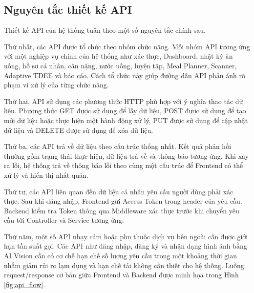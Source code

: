 \documentclass[12pt, a4paper]{report}
\begin{document}
\subsection{Nguyên tắc thiết kế API}Thiết kế API của hệ thống tuân theo một số nguyên tắc chính sau.

Thứ nhất, các API được tổ chức theo nhóm chức năng. Mỗi nhóm API tương ứng với một nghiệp vụ chính của hệ thống như xác thực, Dashboard, nhật ký ăn uống, hồ sơ cá nhân, cân nặng, nước uống, luyện tập, Meal Planner, Scanner, Adaptive TDEE và báo cáo. Cách tổ chức này giúp đường dẫn API phản ánh rõ phạm vi xử lý của từng chức năng.

Thứ hai, API sử dụng các phương thức HTTP phù hợp với ý nghĩa thao tác dữ liệu. Phương thức GET được sử dụng để lấy dữ liệu, POST được sử dụng để tạo mới dữ liệu hoặc thực hiện một hành động xử lý, PUT được sử dụng để cập nhật dữ liệu và DELETE được sử dụng để xóa dữ liệu.

Thứ ba, các API trả về dữ liệu theo cấu trúc thống nhất. Kết quả phản hồi thường gồm trạng thái thực hiện, dữ liệu trả về và thông báo tương ứng. Khi xảy ra lỗi, hệ thống trả về thông báo lỗi theo cùng một cấu trúc để Frontend có thể xử lý và hiển thị nhất quán.

Thứ tư, các API liên quan đến dữ liệu cá nhân yêu cầu người dùng phải xác thực. Sau khi đăng nhập, Frontend gửi Access Token trong header của yêu cầu. Backend kiểm tra Token thông qua Middleware xác thực trước khi chuyển yêu cầu tới Controller và Service tương ứng.

Thứ năm, một số API nhạy cảm hoặc phụ thuộc dịch vụ bên ngoài cần được giới hạn tần suất gọi. Các API như đăng nhập, đăng ký và nhận dạng hình ảnh bằng AI Vision cần có cơ chế hạn chế số lượng yêu cầu trong một khoảng thời gian nhằm giảm rủi ro lạm dụng và hạn chế tải không cần thiết cho hệ thống. Luồng request/response cơ bản giữa Frontend và Backend được minh họa trong Hình \ref{fig:api_flow}.
\end{document}
